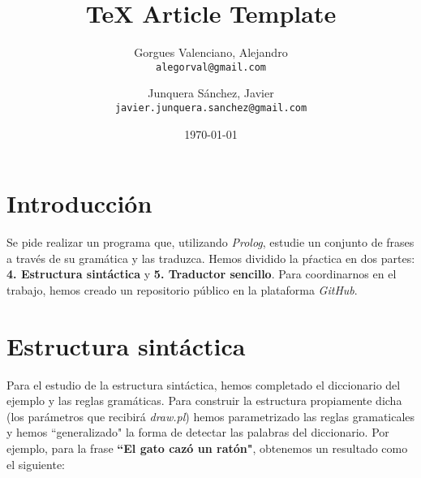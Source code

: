 \documentclass[a4paper]{memoir}
\title{\TeX{} Article Template}
\author{Gorgues Valenciano, Alejandro\\
        \texttt{alegorval@gmail.com}
        \and
        Junquera Sánchez, Javier\\
        \texttt{javier.junquera.sanchez@gmail.com}}
\date{\today}
\begin{document}
    \maketitle


    \section*{Introducción}

    Se pide realizar un programa que, utilizando \emph{Prolog}, estudie un conjunto de frases a través de su gramática y las traduzca. Hemos dividido la pŕactica en dos partes: \textbf{4. Estructura sintáctica} y \textbf{5. Traductor sencillo}. Para coordinarnos en el trabajo, hemos creado un repositorio público en la plataforma \emph{GitHub}\cite{REPO}.

    \section*{Estructura sintáctica}

    Para el estudio de la estructura sintáctica, hemos completado el diccionario del ejemplo y las reglas gramáticas. Para construir la estructura propiamente dicha (los parámetros que recibirá \emph{draw.pl}) hemos parametrizado las reglas gramaticales y hemos ``generalizado" la forma de detectar las palabras del diccionario. Por ejemplo, para la frase \textbf{``El gato cazó un ratón"}, obtenemos un resultado como el siguiente:\\

\end{document}

